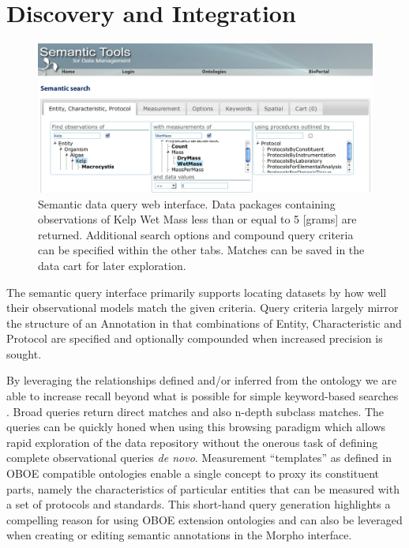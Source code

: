 
\section{Discovery and Integration}
\label{sec:application}

\begin{figure}[!t]
\centering
\includegraphics[width=1.0\textwidth]{images/metacat-query.png}
\caption{Semantic data query web interface. Data packages containing observations of Kelp Wet Mass less than or equal to 5 [grams] are returned. Additional search options and compound query criteria can be specified within the other tabs. Matches can be saved in the data cart for later exploration.}
\label{fig:metacat-query}
\end{figure}

 The semantic query interface primarily supports locating datasets by how well their observational models match the given criteria. Query criteria largely mirror the structure of an Annotation in that combinations of Entity, Characteristic and Protocol are specified and optionally compounded when increased precision is sought. 

By leveraging the relationships defined and/or inferred from the
ontology we are able to increase recall beyond what is possible for
simple keyword-based searches
\cite{berkley09:_improv_data_discov_for_metad}. Broad queries return
direct matches and also n-depth subclass matches. The queries can be
quickly honed when using this browsing paradigm which allows rapid
exploration of the data repository without the onerous task of defining
complete observational queries \emph{de novo}. Measurement ``templates''
as defined in OBOE compatible ontologies enable a single concept to
proxy its constituent parts, namely the characteristics of
particular entities that can be measured with a set of protocols and
standards. This short-hand query generation highlights a
compelling reason for using OBOE extension ontologies and can
also be leveraged when creating or editing semantic annotations in the Morpho interface.  

